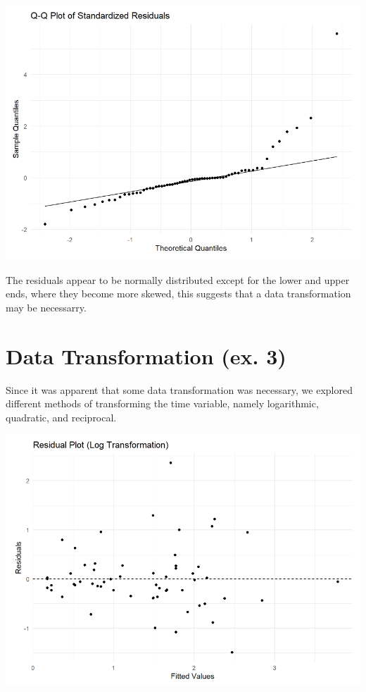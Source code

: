 \documentclass{article}
\begin{document}
\begin{center}
\includegraphics[scale=0.5]{graphs/qq-residuals.png}
\end{center}

The residuals appear to be normally distributed except for the lower and upper ends, where they become more skewed, this suggests that a data transformation may be necessarry.


\section{Data Transformation (ex. 3)}

Since it was apparent that some data transformation was necessary, we explored different methods of transforming the time variable, namely logarithmic, quadratic, and reciprocal.

\begin{center}
\includegraphics[scale=0.5]{graphs/graph-log.png}
\end{center}
\end{document}
